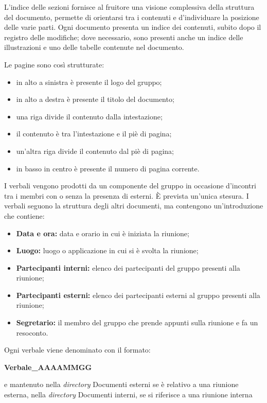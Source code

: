 L'indice delle sezioni fornisce al fruitore una visione complessiva della struttura del documento, permette di orientarsi tra i contenuti e d'individuare la posizione delle varie parti. Ogni documento presenta un indice dei contenuti, subito dopo il registro delle modifiche; dove necessario, sono presenti anche un indice delle illustrazioni e uno delle tabelle contenute nel documento.

Le pagine sono così strutturate:
\begin{itemize}
    \item in alto a sinistra è presente il logo del gruppo;
    \item in alto a destra è presente il titolo del documento;
    \item una riga divide il contenuto dalla intestazione;
    \item il contenuto è tra l'intestazione e il piè di pagina;
    \item un'altra riga divide il contenuto dal piè di pagina;
    \item in basso in centro è presente il numero di pagina corrente.
\end{itemize}
I verbali vengono prodotti da un componente del gruppo in occasione d'incontri tra i membri con o senza la presenza di esterni. È prevista un'unica stesura. I verbali seguono la struttura degli altri documenti, ma contengono un'introduzione che contiene:
\begin{itemize}
    \item \textbf{Data e ora:} data e orario in cui è iniziata la riunione;
    \item \textbf{Luogo:} luogo o applicazione in cui si è svolta la riunione;
    \item \textbf{Partecipanti interni:} elenco dei partecipanti del gruppo presenti alla riunione;
    \item \textbf{Partecipanti esterni:} elenco dei partecipanti esterni al gruppo presenti alla riunione;
    \item \textbf{Segretario:} il membro del gruppo che prende appunti sulla riunione e fa un resoconto.
\end{itemize}
Ogni verbale viene denominato con il formato:
\begin{center}
    \textbf{Verbale\_AAAAMMGG} \\
\end{center}
e mantenuto nella \textit{directory} Documenti esterni se è relativo a una riunione esterna, nella \textit{directory} Documenti interni, se si riferisce a una riunione interna
